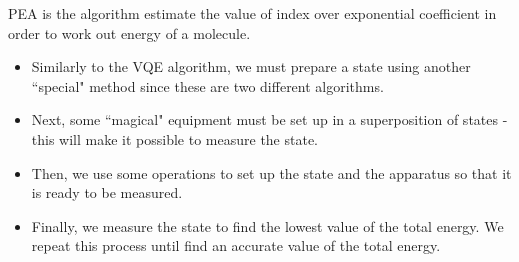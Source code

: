 \documentclass[14pt,landscape,color=UCLdarkred,margin=3cm]{uclposter}
\begin{document}
\begin{multicols}{3}
PEA is the algorithm estimate the value of index over exponential coefficient in order to work out energy of a molecule.

\begin{highlightbox}
\begin{itemize}
\item Similarly to the VQE algorithm, we must prepare a state using another ``special" method since these are two different algorithms. 
\item Next, some ``magical" equipment must be set up in a superposition of states - this will make it possible to measure the state.
\item Then, we use some operations to set up the state and the apparatus so that it is ready to be measured. 
\item Finally, we measure the state to find the lowest value of the total energy. We repeat this process until find an accurate value of the total energy.
\end{itemize}
\end{highlightbox}




\end{multicols}
\end{document}
